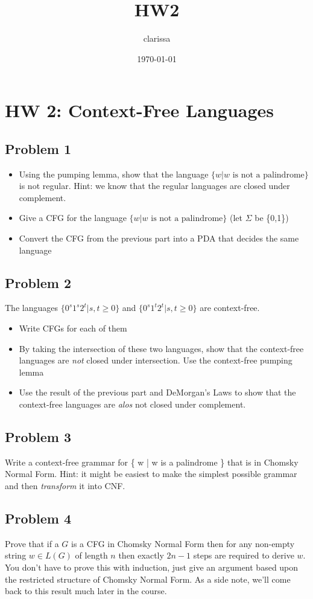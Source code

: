 \documentclass[11pt]{article}
\author{clarissa}
\date{\today}
\title{HW2}
\begin{document}
\maketitle
\tableofcontents

\section{HW 2: Context-Free Languages}
\label{sec-1}
\subsection{Problem 1}
\label{sec-1-1}
\begin{itemize}
\item Using the pumping lemma, show that the language $\{ w | w \text{ is not a palindrome} \}$ is not regular. Hint: we know that the regular languages are closed under complement.
\item Give a CFG for the language $\{ w | w \text{ is not a palindrome} \}$ (let $\Sigma$ be  \{0,1\})
\item Convert the CFG from the previous part into a PDA that decides the same language
\end{itemize}
\subsection{Problem 2}
\label{sec-1-2}
The languages $\{0^s1^s2^t | s,t \ge 0 \}$ and $\{0^s1^t2^t | s,t \ge 0 \}$ are context-free. 
\begin{itemize}
\item Write CFGs for each of them
\item By taking the intersection of these two languages, show that the context-free languages are \emph{not} closed under intersection. Use the context-free pumping lemma
\item Use the result of the previous part and DeMorgan's Laws to show that the context-free languages are \emph{alos} not closed under complement.
\end{itemize}
\subsection{Problem 3}
\label{sec-1-3}
Write a context-free grammar for \{ w | w is a palindrome \} that is in Chomsky Normal Form. Hint: it might be easiest to make the simplest possible grammar and then \emph{transform} it into CNF.
\subsection{Problem 4}
\label{sec-1-4}
Prove that if a $G$ is a CFG in Chomsky Normal Form then for any non-empty string $w \in L(G)$ of length $n$ then exactly $2n - 1$ steps are required to derive $w$. You don't have to prove this with induction, just give an argument based upon the restricted structure of Chomsky Normal Form. As a side note, we'll come back to this result much later in the course.
\end{document}
